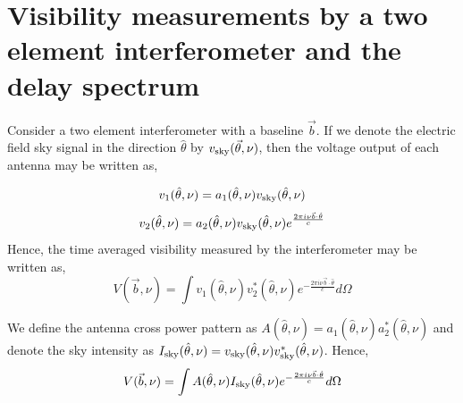 \documentclass[twocolumn]{emulateapj}
\newcommand{\volt}{{v}}
\newcommand{\vis}{{V}}
\newcommand{\sky}{{\rm sky}}
\newcommand{\bmvolt}{{a}}
\newcommand{\beam}{{A}}
\newcommand{\thhat}{{\hat\theta}}
\newcommand{\fngexp}{{e^{\frac{2\pi i\nu\vec{b}\cdot\thhat}{c}}}}
\newcommand{\ifngexp}{{e^{-\frac{2\pi i\nu\vec{b}\cdot\thhat}{c}}}}
\begin{document}
\section{\textbf{Visibility measurements by a two element interferometer and the delay spectrum}}
Consider a two element interferometer with a baseline $\vec b$. If we denote the electric field sky signal in the direction $\thhat$ by $\volt_\sky(\vec \theta, \nu)$, then the voltage output of each antenna may be written as,  

\begin{equation}
\volt_{1}(\thhat, \nu) = \bmvolt_{1}(\thhat,\nu)\volt_\sky(\thhat,\nu)\nonumber\\
\end{equation}
\begin{equation}
\volt_{2} (\thhat, \nu)= \bmvolt_{2}(\thhat,\nu)\volt_\sky(\thhat,\nu)\fngexp\nonumber\\
\end{equation}
Hence, the time averaged visibility measured by the interferometer may be written as, 
\begin{equation}
\vis(\vec b, \nu) =  \int  \volt_{1}(\thhat,\nu)  \volt_{2}^{*} (\thhat, \nu) \ifngexp d\Omega 
\label{eq1}
\end{equation}

We define the antenna cross power pattern as  $\beam(\thhat,\nu)=\bmvolt_{1}(\thhat,\nu)\bmvolt_{2}^{*}(\thhat,\nu)$ and denote the sky intensity as  $I_\sky(\thhat,\nu)=\volt_\sky(\thhat,\nu)\volt_\sky^{*}(\thhat,\nu)$. Hence, 
\begin{equation}
\vis(\vec b,\nu) = \int \beam(\thhat, \nu) I_\sky(\thhat,\nu) \ifngexp d\Omega
\label{eq2}
\end{equation}
\end{document}
